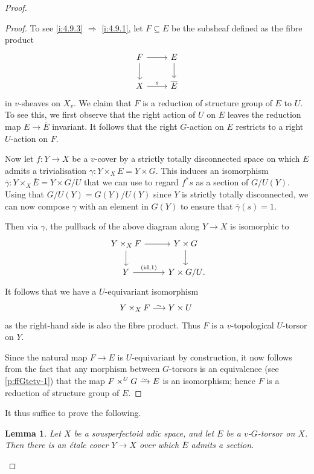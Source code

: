 \documentclass[10pt,a4paper]{article}
\newtheorem{Lemma}[thm]{Lemma}
\theoremstyle{definition}
\theoremstyle{remark}
\newcommand{\lra}{\longrightarrow}
\newcommand*{\lowsim}{\vbox to 0pt{\vss\hbox{$\scriptstyle\sim$}\vskip-2pt}}
\newcommand*{\isomarrow}{\xrightarrow{\lowsim}}
\newcommand*{\longisomarrow}{\stackrel{\lowsim}{\lra}}
\newcommand{\id}{{\operatorname{id}}}
\numberwithin{equation}{section}
\begin{document}
\begin{proof}
\begin{proof}
			
			 To see \eqref{i:4.9.3} $\Rightarrow$ \eqref{i:4.9.1}, let $F\subseteq E$ be the subsheaf defined as the fibre product 
			\[\begin{tikzcd}
				F \arrow[d] \arrow[r] & E \arrow[d] \\
				X \arrow[r,"s"] & \overline{E}
			\end{tikzcd}\]
			in $v$-sheaves on $X_v$. We claim that $F$	is a reduction of structure group of $E$ to $U$. To see this, we first observe that the right action of $U$ on $E$ leaves the reduction map $E\to \overline{E}$ invariant. It follows that the right $G$-action on $E$ restricts to a right $U$-action on $F$. 
			
			Now let  $f\colon Y\to X$ be a $v$-cover by a strictly totally disconnected space on which $E$ admits a trivialisation $\gamma\colon Y\times_XE=Y\times G$. This induces an isomorphism $\overline{\gamma}\colon Y\times_X\overline{E}=Y\times G/U$ that we can use to regard $f^\ast s$ as a section of $G/U(Y)$. Using that $G/U(Y)=G(Y)/U(Y)$ since $Y$ is strictly totally disconnected, we can now compose $\gamma$ with an element in $G(Y)$ to ensure that $\overline{\gamma}(s)=1$.
			
			Then via $\gamma$, the pullback of the above diagram along $Y\to X$ is isomorphic to
			\[\begin{tikzcd}
				Y\times_XF \arrow[d] \arrow[r] & Y\times G \arrow[d] \\
				Y \arrow[r,"{(\id,1)}"] &  Y\times G/U\rlap{.}
			\end{tikzcd} \]
			It follows that we have a $U$-equivariant isomorphism
			\[ Y\times_XF\longisomarrow Y\times U\,\]
			as the right-hand side is also the fibre product. Thus $F$ is a $v$-topological $U$-torsor on $Y$.
			
			Since the natural map $F\to E$ is $U$-equivariant by construction, it now follows from the fact that any morphism between $G$-torsors is an equivalence (see \eqref{p:ffGtetv-1}) that the map $F\times^UG\isomarrow E$ is an isomorphism; hence $F$ is a reduction of structure group of $E$.
	\end{proof}
        
		It thus suffice to prove the following. 

	        \begin{Lemma}\label{l:section-over-et-cover}
			Let $X$ be a sousperfectoid adic space, and let $E$ be a $v$-$G$-torsor on $X$. Then
			there is an \'etale cover $Y\to X$ over which $\overline{E}$ admits a section.
		\end{Lemma}


\end{proof}
\end{document}
